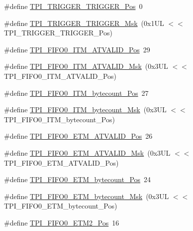 \begin{DoxyCompactItemize}
\#define \mbox{\hyperlink{group___c_m_s_i_s___t_p_i_ga5517fa2ced64efbbd413720329c50b99}{T\+P\+I\+\_\+\+T\+R\+I\+G\+G\+E\+R\+\_\+\+T\+R\+I\+G\+G\+E\+R\+\_\+\+Pos}}~0
\item 
\#define \mbox{\hyperlink{group___c_m_s_i_s___t_p_i_ga814227af2b2665a0687bb49345e21110}{T\+P\+I\+\_\+\+T\+R\+I\+G\+G\+E\+R\+\_\+\+T\+R\+I\+G\+G\+E\+R\+\_\+\+Msk}}~(0x1\+U\+L $<$$<$ T\+P\+I\+\_\+\+T\+R\+I\+G\+G\+E\+R\+\_\+\+T\+R\+I\+G\+G\+E\+R\+\_\+\+Pos)
\item 
\#define \mbox{\hyperlink{group___c_m_s_i_s___t_p_i_gaa7e050e9eb6528241ebc6835783b6bae}{T\+P\+I\+\_\+\+F\+I\+F\+O0\+\_\+\+I\+T\+M\+\_\+\+A\+T\+V\+A\+L\+I\+D\+\_\+\+Pos}}~29
\item 
\#define \mbox{\hyperlink{group___c_m_s_i_s___t_p_i_ga94cb2493ed35d2dab7bd4092b88a05bc}{T\+P\+I\+\_\+\+F\+I\+F\+O0\+\_\+\+I\+T\+M\+\_\+\+A\+T\+V\+A\+L\+I\+D\+\_\+\+Msk}}~(0x3\+U\+L $<$$<$ T\+P\+I\+\_\+\+F\+I\+F\+O0\+\_\+\+I\+T\+M\+\_\+\+A\+T\+V\+A\+L\+I\+D\+\_\+\+Pos)
\item 
\#define \mbox{\hyperlink{group___c_m_s_i_s___t_p_i_gac2b6f7f13a2fa0be4aa7645a47dcac52}{T\+P\+I\+\_\+\+F\+I\+F\+O0\+\_\+\+I\+T\+M\+\_\+bytecount\+\_\+\+Pos}}~27
\item 
\#define \mbox{\hyperlink{group___c_m_s_i_s___t_p_i_ga07bafa971b8daf0d63b3f92b9ae7fa16}{T\+P\+I\+\_\+\+F\+I\+F\+O0\+\_\+\+I\+T\+M\+\_\+bytecount\+\_\+\+Msk}}~(0x3\+U\+L $<$$<$ T\+P\+I\+\_\+\+F\+I\+F\+O0\+\_\+\+I\+T\+M\+\_\+bytecount\+\_\+\+Pos)
\item 
\#define \mbox{\hyperlink{group___c_m_s_i_s___t_p_i_ga7fdeb3e465ca4aa9e3b2f424ab3bbd1d}{T\+P\+I\+\_\+\+F\+I\+F\+O0\+\_\+\+E\+T\+M\+\_\+\+A\+T\+V\+A\+L\+I\+D\+\_\+\+Pos}}~26
\item 
\#define \mbox{\hyperlink{group___c_m_s_i_s___t_p_i_ga4f0005dc420b28f2369179a935b9a9d3}{T\+P\+I\+\_\+\+F\+I\+F\+O0\+\_\+\+E\+T\+M\+\_\+\+A\+T\+V\+A\+L\+I\+D\+\_\+\+Msk}}~(0x3\+U\+L $<$$<$ T\+P\+I\+\_\+\+F\+I\+F\+O0\+\_\+\+E\+T\+M\+\_\+\+A\+T\+V\+A\+L\+I\+D\+\_\+\+Pos)
\item 
\#define \mbox{\hyperlink{group___c_m_s_i_s___t_p_i_ga2f738e45386ebf58c4d406f578e7ddaf}{T\+P\+I\+\_\+\+F\+I\+F\+O0\+\_\+\+E\+T\+M\+\_\+bytecount\+\_\+\+Pos}}~24
\item 
\#define \mbox{\hyperlink{group___c_m_s_i_s___t_p_i_gad2536b3a935361c68453cd068640af92}{T\+P\+I\+\_\+\+F\+I\+F\+O0\+\_\+\+E\+T\+M\+\_\+bytecount\+\_\+\+Msk}}~(0x3\+U\+L $<$$<$ T\+P\+I\+\_\+\+F\+I\+F\+O0\+\_\+\+E\+T\+M\+\_\+bytecount\+\_\+\+Pos)
\item 
\#define \mbox{\hyperlink{group___c_m_s_i_s___t_p_i_ga5f0037cc80c65e86d9e94e5005077a48}{T\+P\+I\+\_\+\+F\+I\+F\+O0\+\_\+\+E\+T\+M2\+\_\+\+Pos}}~16
$$
\end{DoxyCompactItemize}
